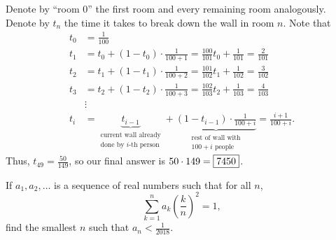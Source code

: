 \documentclass[letterpaper,oneside]{scrartcl}
\begin{document}
\begin{soln}
  Denote by ``room 0'' the first room and every remaining room analogously. Denote by \(t_n\) the time it takes to break down the wall in room \(n\). Note that
  \begin{align*}
    t_0 & = \frac{1}{100}                                                                        \\
    t_1 & = t_0 + (1-t_0)\cdot\frac{1}{100+1} = \frac{100}{101}t_0+\frac{1}{101} = \frac{2}{101} \\
    t_2 & = t_1 + (1-t_1)\cdot\frac{1}{100+2} = \frac{101}{102}t_1+\frac{1}{102} = \frac{3}{102} \\
    t_3 & = t_2 + (1-t_2)\cdot\frac{1}{100+3} = \frac{102}{103}t_2+\frac{1}{103} = \frac{4}{103} \\
        & \vdots                                                                                 \\
    t_i & = \underbrace{t_{i-1}}_{\substack{\text{current wall already}                          \\\text{done by } i\text{-th person}}} + \underbrace{(1-t_{i-1})\cdot\frac{1}{100+i}}_{\substack{\text{rest of wall with}\\100 + i \text{ people}}} = \frac{i+1}{100+i}.
  \end{align*}
  Thus, \(t_{49} = \frac{50}{149}\), so our final answer is \(50\cdot149 = \fbox{7450}\).
\end{soln}
\begin{problem*}
  If \(a_1,a_2,\dots\) is a sequence of real numbers such that for all \(n\), \[\sum_{k=1}^n a_k\left(\frac{k}{n}\right)^2=1,\] find the smallest \(n\) such that \(a_n < \frac{1}{2018}\).
\end{problem*}
\end{document}
